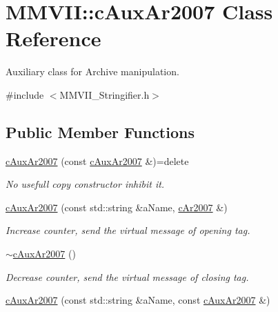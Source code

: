 \hypertarget{classMMVII_1_1cAuxAr2007}{}\section{M\+M\+V\+II\+:\+:c\+Aux\+Ar2007 Class Reference}
\label{classMMVII_1_1cAuxAr2007}


Auxiliary class for Archive manipulation.  




{\ttfamily \#include $<$M\+M\+V\+I\+I\+\_\+\+Stringifier.\+h$>$}

\subsection*{Public Member Functions}
\begin{DoxyCompactItemize}
\item 
\hyperlink{classMMVII_1_1cAuxAr2007_ad02e82b9c6a9c89d4f855626e9bed16b}{c\+Aux\+Ar2007} (const \hyperlink{classMMVII_1_1cAuxAr2007}{c\+Aux\+Ar2007} \&)=delete\hypertarget{classMMVII_1_1cAuxAr2007_ad02e82b9c6a9c89d4f855626e9bed16b}{}\label{classMMVII_1_1cAuxAr2007_ad02e82b9c6a9c89d4f855626e9bed16b}

\begin{DoxyCompactList}\small\item\em No usefull copy constructor inhibit it. \end{DoxyCompactList}\item 
\hyperlink{classMMVII_1_1cAuxAr2007_adeeae2ba4b9cb404829d827398baa5a7}{c\+Aux\+Ar2007} (const std\+::string \&a\+Name, \hyperlink{classMMVII_1_1cAr2007}{c\+Ar2007} \&)\hypertarget{classMMVII_1_1cAuxAr2007_adeeae2ba4b9cb404829d827398baa5a7}{}\label{classMMVII_1_1cAuxAr2007_adeeae2ba4b9cb404829d827398baa5a7}

\begin{DoxyCompactList}\small\item\em Increase counter, send the virtual message of opening tag. \end{DoxyCompactList}\item 
\hyperlink{classMMVII_1_1cAuxAr2007_ab90efc168a0dd7c15c0ef09b802ddf93}{$\sim$c\+Aux\+Ar2007} ()\hypertarget{classMMVII_1_1cAuxAr2007_ab90efc168a0dd7c15c0ef09b802ddf93}{}\label{classMMVII_1_1cAuxAr2007_ab90efc168a0dd7c15c0ef09b802ddf93}

\begin{DoxyCompactList}\small\item\em Decrease counter, send the virtual message of closing tag. \end{DoxyCompactList}\item 
\hyperlink{classMMVII_1_1cAuxAr2007_abefc14acebb3a13b20b692fd63515937}{c\+Aux\+Ar2007} (const std\+::string \&a\+Name, const \hyperlink{classMMVII_1_1cAuxAr2007}{c\+Aux\+Ar2007} \&)\hypertarget{classMMVII_1_1cAuxAr2007_abefc14acebb3a13b20b692fd63515937}{}\label{classMMVII_1_1cAuxAr2007_abefc14acebb3a13b20b692fd63515937}


\end{DoxyCompactItemize}
